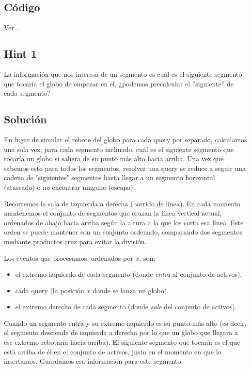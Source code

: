 \subsection*{Código}
Ver .

\subsection*{Hint 1}
La información que nos interesa de un segmento es cuál es el siguiente segmento que tocaría el globo de empezar en el, ¿podemos precalcular el ''siguiente'' de cada segmento?
\subsection*{Solución}
En lugar de simular el rebote del globo para cada query por
separado, calculamos una sola vez, para cada segmento inclinado, cuál es el siguiente segmento que tocaría un globo si saliera de su punto más alto hacia arriba. Una vez que sabemos esto para todos los segmentos, resolver una query se reduce a seguir una cadena de "siguientes" segmentos hasta llegar a un segmento horizontal (atascado) o no encontrar ninguno (escapa).

Recorremos la sala de izquierda a derecha (barrido de línea). En cada momento
mantenemos el conjunto de segmentos que cruzan la línea vertical actual, ordenados de abajo hacia arriba según la altura a la que los corta esa línea. Este orden se puede mantener con un conjunto ordenado, comparando dos segmentos mediante productos cruz para evitar la división.
 
Los eventos que procesamos, ordenados por $x$, son:
\begin{itemize}
    \item el extremo izquierdo de cada segmento (donde \emph{entra}
          al conjunto de activos),
    \item cada query (la posición $x$ donde se lanza un globo),
    \item el extremo derecho de cada segmento (donde \emph{sale}
          del conjunto de activos).
\end{itemize}
 
Cuando un segmento entra y su extremo izquierdo es su punto más alto (es decir, el segmento desciende de izquierda a derecha por lo que un globo que llegara a ese extremo rebotaría hacia arriba). El siguiente segmento que tocaría es el que está arriba de él en el conjunto de activos, justo en el momento en que lo insertamos. Guardamos esa
información para este segmento.
 
